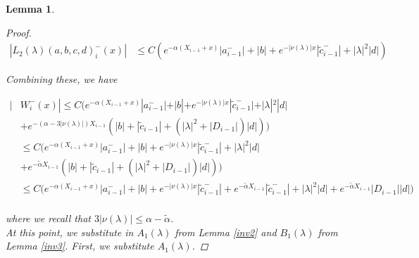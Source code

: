 \documentclass[12pt]{article}
\newtheorem{lemma}{Lemma}
\begin{document}
\begin{lemma}
\begin{proof}
\begin{align*}
|L_2(\lambda)(a,b,c,d)_i^-(x)| &\leq C (e^{-\alpha(X_{i-1} + x)}|a_{i-1}^-| + |b| + e^{-|\nu(\lambda)|x} |\tilde{c}_{i-1}^-| + |\lambda|^2 |d| )
\end{align*}

Combining these, we have

\begin{align*}
| &W_i^-(x)| \leq C \Big(e^{-\alpha(X_{i-1} + x)}|a_{i-1}^-| + |b| + e^{-|\nu(\lambda)|x} |\tilde{c}_{i-1}^-| + |\lambda|^2 |d| \\
&+ e^{-(\alpha - 3|\nu(\lambda)|)X_{i-1}} ( |b| + |\tilde{c}_{i-1}| + (|\lambda|^2 + |D_{i-1}|)|d| ) \Big) \\
&\leq C \Big(e^{-\alpha(X_{i-1} + x)}|a_{i-1}^-| + |b| + e^{-|\nu(\lambda)|x} |\tilde{c}_{i-1}^-| + |\lambda|^2 |d| \\
&+ e^{-\tilde{\alpha} X_{i-1}} ( |b| + |\tilde{c}_{i-1}| + (|\lambda|^2 + |D_{i-1}|)|d| ) \Big) \\
&\leq C \Big(e^{-\alpha(X_{i-1} + x)}|a_{i-1}^-| + |b| + e^{-|\nu(\lambda)|x} |\tilde{c}_{i-1}^-| + e^{-\tilde{\alpha} X_{i-1}} |\tilde{c}_{i-1}^-| + |\lambda|^2 |d| + e^{-\tilde{\alpha} X_{i-1}} |D_{i-1}||d| \Big) \\
\end{align*}

where we recall that $3|\nu(\lambda)| \leq \alpha - \tilde{\alpha}$.\\

At this point, we substitute in $A_1(\lambda)$ from Lemma \ref{inv2} and $B_1(\lambda)$ from Lemma \ref{inv3}. First, we substitute $A_1(\lambda)$.


\end{proof}
\end{lemma}
\end{document}
